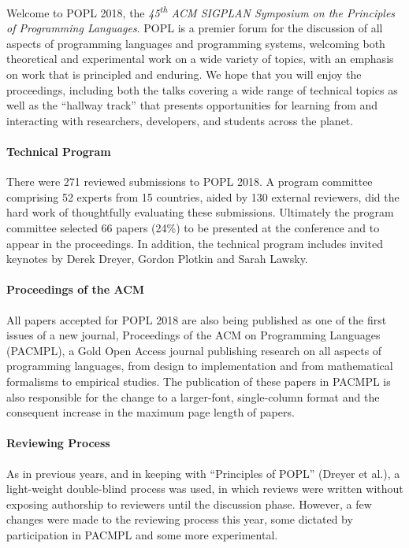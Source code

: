 \label{Preface}

\newcommand\person[1]{{#1}}

\noindent

Welcome to POPL 2018, the
\emph{45\textsuperscript{th} ACM SIGPLAN Symposium
on the Principles of Programming Languages}.
%
POPL is a premier forum for the discussion of all aspects
of programming languages and programming systems, welcoming
both theoretical and experimental work on a wide variety of
topics, with an emphasis on work that is principled and enduring.
%
We hope that you will enjoy the proceedings,
including both the talks covering a wide range
of technical topics as well as the ``hallway track''
that presents opportunities for learning from
and interacting with researchers, developers,
and students across the planet.


\paragraph{Technical Program}
%
There were 271 reviewed submissions to POPL 2018.
%
A program committee comprising 52 experts from 15 countries,
aided by 130 external reviewers, did the hard work of
thoughtfully evaluating these submissions.
%
Ultimately the program committee selected 66 papers (24\%)
to be presented at the conference and to appear in the
proceedings.
%
In addition, the technical program includes invited keynotes
by Derek Dreyer, Gordon Plotkin and Sarah Lawsky.

\paragraph{Proceedings of the ACM}
%
All papers accepted for POPL 2018 are also being published as one
of the first issues of a new journal, Proceedings of the ACM on
Programming Languages (PACMPL), a Gold Open Access journal publishing
research on all aspects of programming languages, from design to
implementation and from mathematical formalisms to empirical studies.
The publication of these papers in PACMPL is also responsible for
the change to a larger-font, single-column format and the consequent
increase in the maximum page length of papers.

\paragraph{Reviewing Process}
%
As in previous years, and in keeping with ``Principles of POPL'' (Dreyer et
al.), a light-weight double-blind process was used, in which reviews were
written without exposing authorship to reviewers until the discussion phase.
However, a few changes were made to the reviewing process this year,
some dictated by participation in PACMPL and some more experimental.

